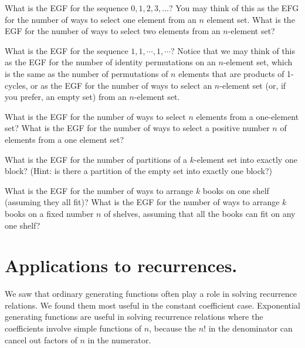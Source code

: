 \itemm What is the EGF for the sequence
$0,1,2,3,\ldots$?  You may think of this as the EFG for the number of ways
to select one element from an $n$ element set.  What is the EGF for the
number of ways to select two elements from an
$n$-element set?

\itemes What is the EGF for the sequence
$1,1,\cdots,1,\cdots$?  Notice that we may think of this as the
EGF for the number of identity permutations
on an $n$-element set, which is the same as the number of permutations of
$n$ elements that are products of 1-cycles, or as the EGF for the number
of ways to select an
$n$-element set (or, if you prefer, an empty set) from an
$n$-element set.\label{allonessequence}

\itemm  What is the EGF for the number of ways
to select $n$ elements from a one-element set?  What is the EGF for the
number of ways to select a positive number $n$ of elements from a one
element set? 

\itemes What is the EGF for the number of partitions of a
$k$-element set into exactly one block?  (Hint:
is there a partition of the empty set into
exactly one block?)\label{oneblockpartitions}

\itemes What is the EGF for the number of ways
to arrange $k$ books on one shelf (assuming they all fit)?  What is the
EGF for the number of ways to arrange $k$
books on a fixed number
$n$ of shelves, assuming that all the books can fit on any one
shelf?\label{exponentialbookshelf}

\ep

  

\section{Applications to recurrences.} 
We saw that ordinary generating functions often play a role in solving
recurrence relations.  We found them most useful in the constant
coefficient case.  Exponential generating functions are useful in solving
recurrence relations where the coefficients involve simple functions of
$n$, because the $n!$ in the denominator can cancel out factors of $n$ in
the numerator.  

